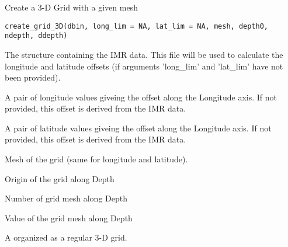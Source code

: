 %
\begin{Description}\relax
Create a 3-D Grid with a given mesh
\end{Description}
%
\begin{Usage}
\begin{verbatim}
create_grid_3D(dbin, long_lim = NA, lat_lim = NA, mesh, depth0, ndepth, ddepth)
\end{verbatim}
\end{Usage}
%
\begin{Arguments}
\begin{ldescription}
\item[\code{dbin}] 
The  structure containing the IMR data. This file
will be used to calculate the longitude and latitude offsets (if arguments
'long\_lim' and 'lat\_lim' have not been provided).

\item[\code{long\_lim}] 
A pair of longitude values giveing the offset along the Longitude axis.
If not provided, this offset is derived from the IMR data.

\item[\code{lat\_lim}] 
A pair of latitude values giveing the offset along the Longitude axis.
If not provided, this offset is derived from the IMR data.

\item[\code{mesh}] 
Mesh of the grid (same for longitude and latitude).

\item[\code{depth0}] 
Origin of the grid along Depth

\item[\code{ndepth}] 
Number of grid mesh along Depth

\item[\code{ddepth}] 
Value of the grid mesh along Depth

\end{ldescription}
\end{Arguments}
%
\begin{Value}
A  organized as a regular 3-D grid.
\end{Value}
